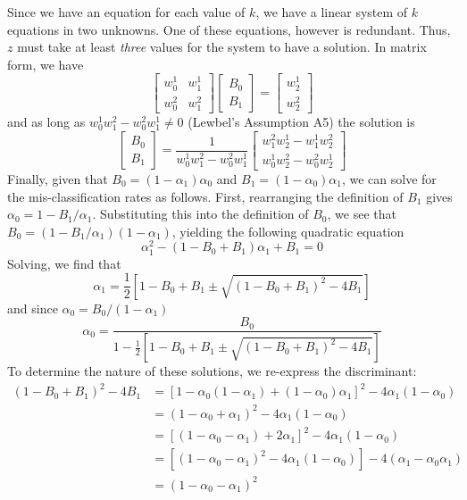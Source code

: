 Since we have an equation for each value of $k$, we have a linear system of $k$ equations in two unknowns.
One of these equations, however is redundant.
Thus, $z$ must take at least \emph{three} values for the system to have a solution.
In matrix form, we have
\[
\left[\begin{array}{cc}
w_{0}^{1} & w{}_{1}^{1}\\
w_{0}^{2} & w_{1}^{2}
\end{array}\right]\left[\begin{array}{c}
B_{0}\\
B_{1}
\end{array}\right]=\left[\begin{array}{c}
w_{2}^{1}\\
w_{2}^{2}
\end{array}\right]
\]
and as long as $w_{0}^{1}w_{1}^{2}-w_{0}^{2}w_{1}^{1}\neq0$ (Lewbel's Assumption A5) the solution is
\[
\left[\begin{array}{c}
B_{0}\\
B_{1}
\end{array}\right]=\frac{1}{w_{0}^{1}w_{1}^{2}-w_{0}^{2}w_{1}^{1}}\left[\begin{array}{c}
w_{1}^{2}w_{2}^{1}-w_{1}^{1}w_{2}^{2}\\
w_{0}^{1}w_{2}^{2}-w_{0}^{2}w_{2}^{1}
\end{array}\right]
\]
Finally, given that $B_{0}=(1-\alpha_{1})\alpha_{0}$ and $B_{1}=(1-\alpha_{0})\alpha_{1}$, we can solve for the mis-classification rates as follows.
First, rearranging the definition of $B_1$ gives $\alpha_0 = 1 - B_1/\alpha_1$.
Substituting this into the definition of $B_0$, we see that $B_0 = (1 - B_1/\alpha_1)(1-\alpha_1)$, yielding the following quadratic equation
\begin{equation*}
  \alpha_1^2 - (1 - B_0 + B_1) \alpha_1 + B_1 = 0
\end{equation*}
Solving, we find that
\[
\alpha_{1}=\frac{1}{2}\left[1-B_{0}+B_{1}\pm\sqrt{(1-B_{0}+B_{1})^{2}-4B_{1}}\right]
\]
and since $\alpha_0 = B_0/(1- \alpha_1)$
\[
\alpha_{0}=\frac{B_{0}}{1-\frac{1}{2}\left[1-B_{0}+B_{1}\pm\sqrt{(1-B_{0}+B_{1})^{2}-4B_{1}}\right]}
\]
To determine the nature of these solutions, we re-express the discriminant: \begin{align*}
  (1 - B_0 + B_1)^2 - 4 B_1 &=\left[ 1 - \alpha_0\left( 1 - \alpha_1 \right) + \left( 1 - \alpha_0 \right)\alpha_1 \right]^2 - 4\alpha_1(1 - \alpha_0) \\
  &= \left( 1 - \alpha_0 + \alpha_1 \right)^2 - 4\alpha_1(1 - \alpha_0) \\
  &= \left[ (1 - \alpha_0 - \alpha_1) + 2\alpha_1 \right]^2 - 4\alpha_1(1 - \alpha_0)\\
  &= \left[(1 - \alpha_0 - \alpha_1)^2 - 4\alpha_1(1- \alpha_0)\right] - 
  4(\alpha_1 - \alpha_0 \alpha_1) \\
  &= (1 -\alpha_0 - \alpha_1)^2
\end{align*}
